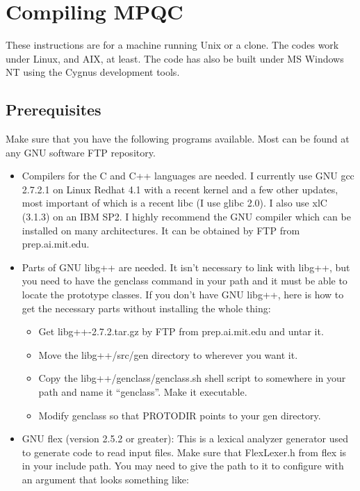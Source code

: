 
\chapter{Compiling MPQC}


These instructions are for a machine running Unix or a clone. The codes
work under Linux, and AIX, at least.  The code has also be built under MS
Windows NT using the Cygnus development tools.

\section{Prerequisites}
 Make sure that you have the following programs available. Most can be
found at any GNU software FTP repository.
  \begin{itemize}

    \item Compilers for the C and C++ languages are needed. I currently use
          GNU gcc 2.7.2.1 on Linux Redhat 4.1 with a recent kernel and a
          few other updates, most important of which is a recent libc (I
          use glibc 2.0). I also use xlC (3.1.3) on an IBM SP2.  I highly
          recommend the GNU compiler which can be installed on many
          architectures.  It can be obtained by FTP from prep.ai.mit.edu.

    \item Parts of GNU libg++ are needed.  It isn't necessary to link with
          libg++, but you need to have the genclass command in your path
          and it must be able to locate the prototype classes.  If you
          don't have GNU libg++, here is how to get the necessary parts
          without installing the whole thing:

       \begin{itemize}
          \item Get libg++-2.7.2.tar.gz by FTP from prep.ai.mit.edu and
                untar it.
          \item Move the libg++/src/gen directory to wherever you want it.
          \item Copy the libg++/genclass/genclass.sh shell script to
                somewhere in your path and name it ``genclass''.  Make
                it executable.
          \item Modify genclass so that PROTODIR points to your gen
                directory.
       \end{itemize}

    \item GNU flex (version 2.5.2 or greater): This is a lexical analyzer
          generator used to generate code to read input files. Make sure
          that FlexLexer.h from flex is in your include path. You may need
          to give the path to it to configure with an argument that looks
          something like: 


\end{itemize}
